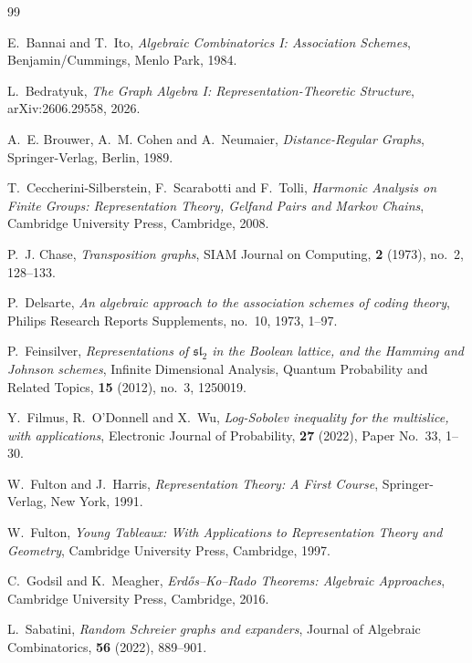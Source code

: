 \documentclass[12pt,reqno]{amsart}
\begin{document}
\begin{thebibliography}{99}

E.~Bannai and T.~Ito,
\textit{Algebraic Combinatorics I: Association Schemes},
Benjamin/Cummings, Menlo Park, 1984.

L.~Bedratyuk,
\textit{The Graph Algebra I: Representation-Theoretic Structure},
arXiv:2606.29558, 2026.

A.~E. Brouwer, A.~M. Cohen and A.~Neumaier,
\textit{Distance-Regular Graphs},
Springer-Verlag, Berlin, 1989.

T.~Ceccherini-Silberstein, F.~Scarabotti and F.~Tolli,
\textit{Harmonic Analysis on Finite Groups: Representation Theory,
Gelfand Pairs and Markov Chains},
Cambridge University Press, Cambridge, 2008.

P.~J. Chase,
\textit{Transposition graphs},
SIAM Journal on Computing, \textbf{2} (1973), no.~2, 128--133.

P.~Delsarte,
\textit{An algebraic approach to the association schemes of coding theory},
Philips Research Reports Supplements, no.~10, 1973, 1--97.

P.~Feinsilver,
\textit{Representations of $\mathfrak{sl}_2$ in the Boolean lattice, and
the Hamming and Johnson schemes},
Infinite Dimensional Analysis, Quantum Probability and Related Topics,
\textbf{15} (2012), no.~3, 1250019.

Y.~Filmus, R.~O'Donnell and X.~Wu,
\textit{Log-Sobolev inequality for the multislice, with applications},
Electronic Journal of Probability, \textbf{27} (2022), Paper No.~33,
1--30.

W.~Fulton and J.~Harris,
\textit{Representation Theory: A First Course},
Springer-Verlag, New York, 1991.

W.~Fulton,
\textit{Young Tableaux: With Applications to Representation Theory and
Geometry},
Cambridge University Press, Cambridge, 1997.

C.~Godsil and K.~Meagher,
\textit{Erd\H{o}s--Ko--Rado Theorems: Algebraic Approaches},
Cambridge University Press, Cambridge, 2016.



L.~Sabatini,
\textit{Random Schreier graphs and expanders},
Journal of Algebraic Combinatorics, \textbf{56} (2022), 889--901.




\end{thebibliography}
\end{document}
